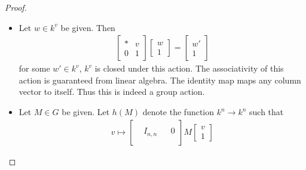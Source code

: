 \documentclass[12pt, psamsfonts]{amsart}
\theoremstyle{definition}
\theoremstyle{remark}
\numberwithin{equation}{section}
\begin{document}
\begin{proof}
  $ $
  \begin{itemize}
    \item
      Let $w \in k^v$ be given.
      Then 
      \begin{align*}
        \begin{bmatrix} * & v \\ 0 & 1 \end{bmatrix}
          \begin{bmatrix} w \\ 1 \end{bmatrix}
            = \begin{bmatrix} w' \\ 1 \end{bmatrix}
      \end{align*}
      for some $w' \in k^v$, $k^v$ is closed under this action.
      The associativity of this action is guaranteed from linear algebra.
      The identity map maps any column vector to itself.
      Thus this is indeed a group action.
    \item
      Let $M \in G$ be given.
      Let $h(M)$ denote the function $k^n \rightarrow k^n$ such that
      \begin{align*}
        v \mapsto
        \left[
        \begin{array}{ccc|c} 
        &          &     & \\
        & I_{n, n} &     & 0 \\
        & & & \end{array} \right]
          M \begin{bmatrix} v \\ 1 \end{bmatrix}
      \end{align*}

  \end{itemize}
\end{proof}
\end{document}
